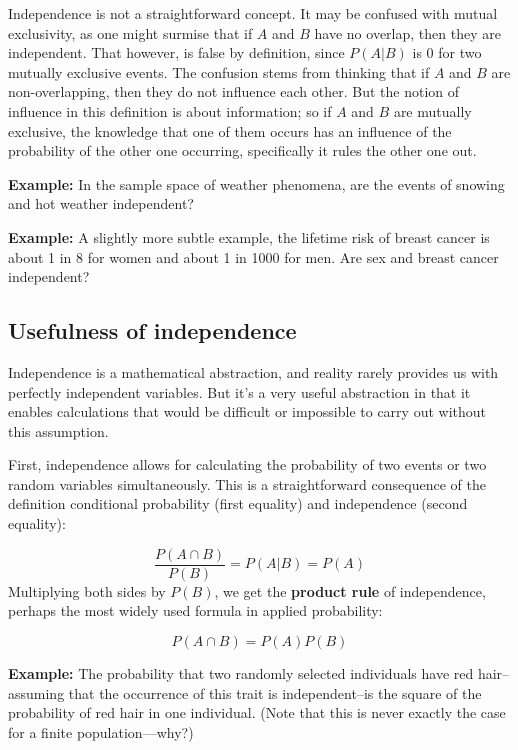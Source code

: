 \documentclass[
  letterpaper,
  DIV=11,
  numbers=noendperiod]{scrreprt}
\begin{document}
Independence is not a straightforward concept. It may be confused with
mutual exclusivity, as one might surmise that if \(A\) and \(B\) have no
overlap, then they are independent. That however, is false by
definition, since \(P(A\vert B)\) is 0 for two mutually exclusive
events. The confusion stems from thinking that if \(A\) and \(B\) are
non-overlapping, then they do not influence each other. But the notion
of influence in this definition is about information; so if \(A\) and
\(B\) are mutually exclusive, the knowledge that one of them occurs has
an influence of the probability of the other one occurring, specifically
it rules the other one out.

\textbf{Example:} In the sample space of weather phenomena, are the
events of snowing and hot weather independent?

\textbf{Example:} A slightly more subtle example, the lifetime risk of
breast cancer is about 1 in 8 for women and about 1 in 1000 for men. Are
sex and breast cancer independent?

\subsection{Usefulness of
independence}\label{usefulness-of-independence}

Independence is a mathematical abstraction, and reality rarely provides
us with perfectly independent variables. But it's a very useful
abstraction in that it enables calculations that would be difficult or
impossible to carry out without this assumption.

First, independence allows for calculating the probability of two events
or two random variables simultaneously. This is a straightforward
consequence of the definition conditional probability (first equality)
and independence (second equality):

\[\frac{P(A \cap B)}{P(B)}= P(A\vert B) = P(A)\] Multiplying both sides
by \(P(B)\), we get the \textbf{product rule} of independence, perhaps
the most widely used formula in applied probability:

\[P(A \cap B) = P(A)P(B)\]

\textbf{Example:} The probability that two randomly selected individuals
have red hair--assuming that the occurrence of this trait is
independent--is the square of the probability of red hair in one
individual. (Note that this is never exactly the case for a finite
population---why?)
\end{document}
